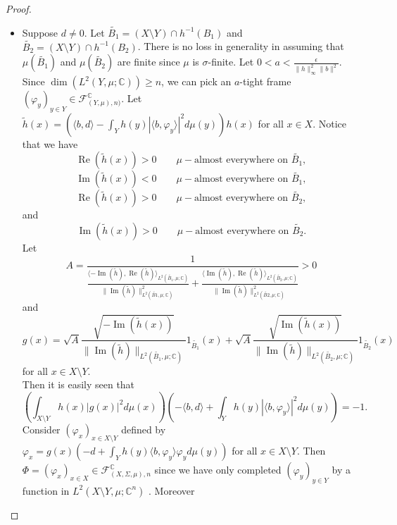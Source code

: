 \documentclass[a4paper,12pt]{article}
\theoremstyle{plain}
\theoremstyle{definition}
\theoremstyle{remark}
\begin{document}
\begin{proof}
\begin{itemize}
\item Suppose $d \neq 0$. Let $\widetilde{B_1} = (X \setminus Y) \cap h^{-1}(B_1)$ and $\widetilde{B_2} = (X \setminus Y) \cap h^{-1}(B_2)$. There is no loss in generality in assuming that $\mu(\widetilde{B_1})$ and $\mu(\widetilde{B_2})$ are finite since $\mu$ is $\sigma$-finite. Let $0 < a < \frac{\epsilon}{\lVert h \rVert_\infty^2 \lVert b \rVert^2}$. Since $\dim(L^2(Y,\mu;\mathbb{C})) \geq n$, we can pick an $a$-tight frame $(\varphi_y)_{y \in Y} \in \mathcal{F}_{(Y,\mu),n)}^\mathbb{C}$. Let $\widetilde{h}(x) = \left(\langle b , d \rangle - \int_Y h(y) |\langle b , \varphi_y \rangle|^2 d\mu(y)\right)h(x)$ for all $x \in X$. Notice that we have 
\[ \operatorname{Re}(\widetilde{h}(x)) > 0 \qquad \mu-\text{almost everywhere on } \widetilde{B_1}, \] 
\[ \operatorname{Im}(\widetilde{h}(x)) < 0 \qquad \mu-\text{almost everywhere on } \widetilde{B_1}, \]
\[ \operatorname{Re}(\widetilde{h}(x)) > 0 \qquad \mu-\text{almost everywhere on } \widetilde{B_2}, \]  
and 
\[ \operatorname{Im}(\widetilde{h}(x)) > 0 \qquad \mu-\text{almost everywhere on } \widetilde{B_2}. \] 
Let 
\[ A = \frac{1}{\frac{\langle - \operatorname{Im}(\tilde{h}), \operatorname{Re}(\tilde{h}) \rangle_{L^2(\tilde{B_1},\mu;\mathbb{C})}}{\lVert \operatorname{Im}(\tilde{h}) \rVert_{L^2(\tilde{B1},\mu;\mathbb{C})}^2} + \frac{\langle \operatorname{Im}(\tilde{h}), \operatorname{Re}(\tilde{h}) \rangle_{L^2(\tilde{B_2},\mu;\mathbb{C})}}{\lVert \operatorname{Im}(\tilde{h}) \rVert_{L^2(\tilde{B2},\mu;\mathbb{C})}^2}} > 0 \]
and 
\[ g(x) = \sqrt{A} \frac{\sqrt{-\operatorname{Im}(\widetilde{h}(x))}}{\lVert \operatorname{Im}(\widetilde{h}) \rVert_{L^2(\widetilde{B_1},\mu;\mathbb{C})}} 1_{\widetilde{B_1}}(x) + \sqrt{A} \frac{\sqrt{\operatorname{Im}(\widetilde{h}(x))}}{\lVert \operatorname{Im}(\widetilde{h}) \rVert_{L^2(\widetilde{B_2},\mu;\mathbb{C})}} 1_{\widetilde{B_2}}(x) \]
for all  $x \in X \setminus Y$. \\
Then it is easily seen that 
\begin{equation}
\label{eq1}
\left( \int_{X \setminus Y} h(x) |g(x)|^2 d\mu(x) \right) \left( -\langle b , d \rangle + \int_Y h(y) | \langle b , \varphi_y \rangle | ^2 d\mu(y) \right) = -1. 
\end{equation}
Consider $(\varphi_x)_{x \in X \setminus Y}$ defined by $\varphi_x = g(x)\left(-d + \int_Y h(y) \langle b , \varphi_y \rangle \varphi_y d\mu(y) \right)$ for all $x \in X \setminus Y$. Then $\Phi = (\varphi_x)_{x \in X} \in \mathcal{F}_{(X,\Sigma,\mu),n}^\mathbb{C}$ since we have only completed $(\varphi_y)_{y \in Y}$ by a function in $L^2(X \setminus Y,\mu;\mathbb{C}^n)$ . Moreover

\end{itemize}
\end{proof}
\end{document}
